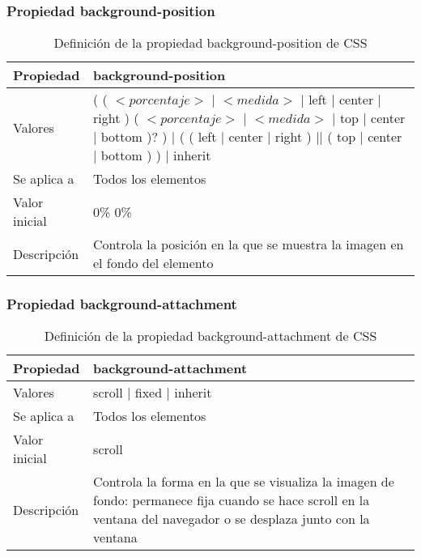 \begin{frame}
\frametitle{Propiedad background-position}

\begin{center}
  \begin{table}
   \begin{tabular}{p{1.8cm}p{7.8cm}}
Propiedad & \bf{background-position} \\ \hline
Valores& ( ( $<porcentaje>$ | $<medida>$ | left | center | right ) ( $<porcentaje>$ | $<medida>$ | top | center | bottom )? ) | ( ( left | center | right ) || ( top | center | bottom ) ) | inherit \\ \hline
Se aplica a& Todos los elementos \\ \hline
Valor inicial& 0\% 0\% \\ \hline
Descripción& Controla la posición en la que se muestra la imagen en el fondo del elemento \\ \hline
  \end{tabular}
   \caption{Definición de la propiedad background-position de CSS}
 \end{table}
\end{center}


\end{frame}



\begin{frame}
\frametitle{Propiedad background-attachment}

\begin{center}
  \begin{table}
   \begin{tabular}{p{1.8cm}p{7.8cm}}
Propiedad & \bf{background-attachment} \\ \hline
Valores& scroll | fixed | inherit \\ \hline
Se aplica a& Todos los elementos \\ \hline
Valor inicial& scroll \\ \hline
Descripción& Controla la forma en la que se visualiza la imagen de fondo: permanece fija cuando se hace scroll en la ventana del navegador o se desplaza junto con la ventana \\ \hline
  \end{tabular}
   \caption{Definición de la propiedad background-attachment de CSS}
 \end{table}
\end{center}


\end{frame}


